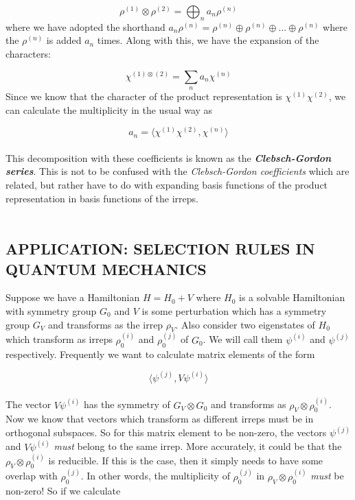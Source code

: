 \documentclass[9 pt]{report}
\begin{document}
$$ \rho^{(1)}\otimes \rho^{(2)} = \bigoplus_n a_n\rho^{(n)} $$
where we have adopted the shorthand $a_n\rho^{(n)} = \rho^{(n)}\oplus \rho^{(n)}\oplus \dots \oplus \rho^{(n)}$ where the $\rho^{(n)}$ is added $a_n$ times. Along with this, we have the expansion of the characters:

$$ \chi^{(1)\otimes(2)} = \sum_n a_n\chi^{(n)} $$
Since we know that the character of the product representation is $\chi^{(1)}\chi^{(2)}$, we can calculate the multiplicity in the usual way as

$$ a_n = \langle \chi^{(1)}\chi^{(2)} , \chi^{(n)} \rangle $$
\\
This decomposition with these coefficients is known as the \textbf{\emph{Clebsch-Gordon series}}. This is not to be confused with the\emph{ Clebsch-Gordon coefficients} which are related, but rather have to do with expanding basis functions of the product representation in basis functions of the irreps.
\\
\\

\begin{center}
	\subsection*{APPLICATION: SELECTION RULES IN QUANTUM MECHANICS}
\end{center}
Suppose we have a Hamiltonian $H = H_0 + V$ where $H_0$ is a solvable Hamiltonian with symmetry group $G_0$ and $V$ is some perturbation which has a symmetry group $G_V$ and transforms as the irrep $\rho_V$. Also consider two eigenstates of $H_0$ which transform as irreps $\rho_0^{(i)}$ and $\rho^{(j)}_0$ of $G_0$. We will call them $\psi^{(i)}$ and $\psi^{(j)}$ respectively. Frequently we want to calculate matrix elements of the form 

$$ \langle\psi^{(j)} , V \psi^{(i)}\rangle $$
\\
The vector $V\psi^{(i)}$ has the symmetry of $G_V\otimes G_0$ and transforms as $\rho_V\otimes\rho_0^{(i)}$. Now we know that vectors which transform as different irreps must be in orthogonal subspaces. So for this matrix element to be non-zero, the vectors $\psi^{(j)}$ and $V\psi^{(i)}$ \emph{must} belong to the same irrep. More accurately, it could be that the $\rho_V\otimes\rho_0^{(i)}$ is reducible. If this is the case, then it simply needs to have some overlap with $\rho_0^{(j)}$. In other words, the multiplicity of $\rho^{(j)}_0$ in $\rho_V\otimes \rho_0^{(i)}$ \emph{must} be non-zero! So if we calculate
\end{document}
